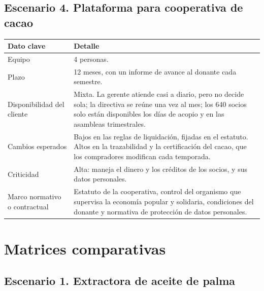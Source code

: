 \documentclass[11pt,a4paper]{article}
\begin{document}
	\subsection{Escenario 4. Plataforma para cooperativa de cacao}
	
	\begin{tabularx}{\textwidth}{|p{4cm}|Y|}
		\hline
		\textbf{Dato clave} & \textbf{Detalle} \\ \hline
		Equipo & 4 personas. \\ \hline
		Plazo & 12 meses, con un informe de avance al donante cada semestre. \\ \hline
		Disponibilidad del cliente & Mixta. La gerente atiende casi a diario, pero no decide sola; la directiva se reúne una vez al mes; los 640 socios solo están disponibles los días de acopio y en las asambleas trimestrales. \\ \hline
		Cambios esperados & Bajos en las reglas de liquidación, fijadas en el estatuto. Altos en la trazabilidad y la certificación del cacao, que los compradores modifican cada temporada. \\ \hline
		Criticidad & Alta: maneja el dinero y los créditos de los socios, y sus datos personales. \\ \hline
		Marco normativo o contractual & Estatuto de la cooperativa, control del organismo que supervisa la economía popular y solidaria, condiciones del donante y normativa de protección de datos personales. \\ \hline
	\end{tabularx}
	
	
	\section{Matrices comparativas}
	
	\subsection{Escenario 1. Extractora de aceite de palma}
	
\end{document}
